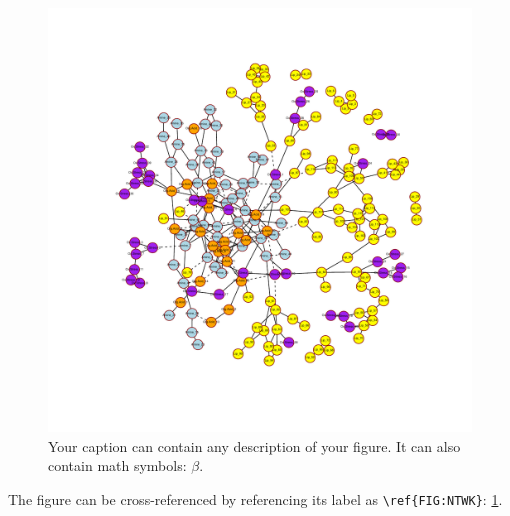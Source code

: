 \documentclass{amsart}
\theoremstyle{plain}
\begin{document}
\begin{figure}[b!]
\centering
  \includegraphics[width=.88\textwidth]{figures/NTWK.pdf}
    \caption{Your caption can contain any description of your figure.
    It can also contain math symbols: $\beta$.}
  \label{FIG:NTWK}
\end{figure}
The figure can be cross-referenced by referencing its label as \verb|\ref{FIG:NTWK}|: \ref{FIG:NTWK}.
\end{document}
